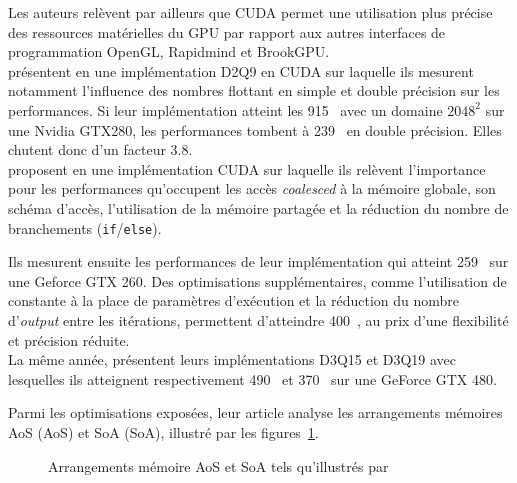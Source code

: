 Les auteurs relèvent par ailleurs que CUDA permet une utilisation plus précise des ressources matérielles du \acs{GPU} par rapport aux autres interfaces de programmation OpenGL, Rapidmind et BrookGPU.\\

\citet{kuznik_lbm_2010} présentent en \citeyear{kuznik_lbm_2010} une implémentation D2Q9 en CUDA sur laquelle ils mesurent notamment l'influence des nombres flottant en simple et double précision sur les performances. Si leur implémentation atteint les 915~  avec un domaine $2048^2$ sur une Nvidia GTX280, les performances tombent à 239~  en double précision. Elles chutent donc d'un facteur 3.8.\\

\citet{rinaldi_lattice-boltzmann_2012} proposent en \citeyear{rinaldi_lattice-boltzmann_2012} une implémentation CUDA sur laquelle ils relèvent l'importance pour les performances qu'occupent les accès \textit{coalesced} à la mémoire globale, son schéma d'accès, l'utilisation de la mémoire partagée et la réduction du nombre de branchements (\texttt{if}/\texttt{else}).

Ils mesurent ensuite les performances de leur implémentation qui atteint  259~ sur une Geforce GTX 260. Des optimisations supplémentaires, comme l'utilisation de constante à la place de paramètres d'exécution et la réduction du nombre d'\textit{output} entre les itérations, permettent d'atteindre 400~, au prix d'une flexibilité et précision réduite.\\

La même année, \citet{astorino_modular_2012} présentent leurs implémentations D3Q15 et D3Q19 avec lesquelles ils atteignent respectivement 490~ et 370~ sur une GeForce GTX 480.

Parmi les optimisations exposées, leur article analyse les arrangements mémoires \acs{AoS} (\acl{AoS}) et \acs{SoA} (\acl{SoA}), illustré par les figures~\ref{fig:aos_soa}.

\begin{figure}[h]
	\centering
	\caption{Arrangements mémoire \acs{AoS} et \acs{SoA} tels qu'illustrés par \cite{astorino_modular_2012}}
	\label{fig:aos_soa}
\end{figure} 

